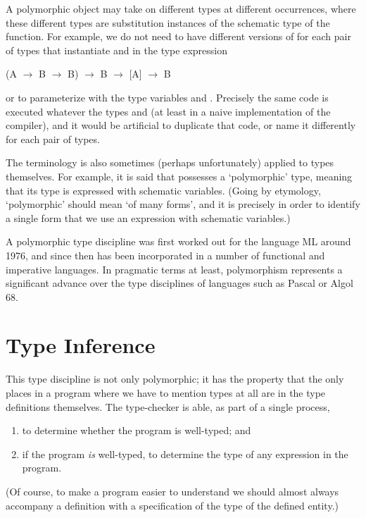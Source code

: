 A polymorphic object may take on different types at different occurrences,
where these different types are substitution instances of the schematic type of
the function. For example, we do not need to have different versions of 
for each pair of types that instantiate  and  in the type expression
\begin{mlcoded}
    (A $\rightarrow$ B $\rightarrow$ B) $\rightarrow$ B $\rightarrow$ [A] $\rightarrow$ B
\end{mlcoded}
or to parameterize  with the type variables  and . Precisely the same
code is executed whatever the types  and  (at least in a naive implementation of the compiler), and it would be artificial to duplicate that code, or
name it differently for each pair of types.

The terminology is also sometimes (perhaps unfortunately) applied to
types themselves. For example, it is said that  possesses a `polymorphic'
type, meaning that its type is expressed with schematic variables. (Going by
etymology, `polymorphic' should mean `of many forms', and it is precisely in
order to identify a single form that we use an expression with schematic
variables.)

A polymorphic type discipline was first worked out for the language ML
around 1976, and since then has been incorporated in a number of functional
and imperative languages. In pragmatic terms at least, polymorphism represents a significant advance over the type disciplines of languages such as
Pascal or Algol 68.

\section{Type Inference}

This type discipline is not only polymorphic; it has the property that the only
places in a program where we have to mention types at all are in the type
definitions themselves. The type-checker is able, as part of a single process,
\begin{enumerate}
    \item to determine whether the program is well-typed; and
    \item if the program \textit{is} well-typed, to determine the type of any expression in the
    program.
\end{enumerate}
(Of course, to make a program easier to understand we should almost always
accompany a definition with a specification of the type of the defined entity.)


